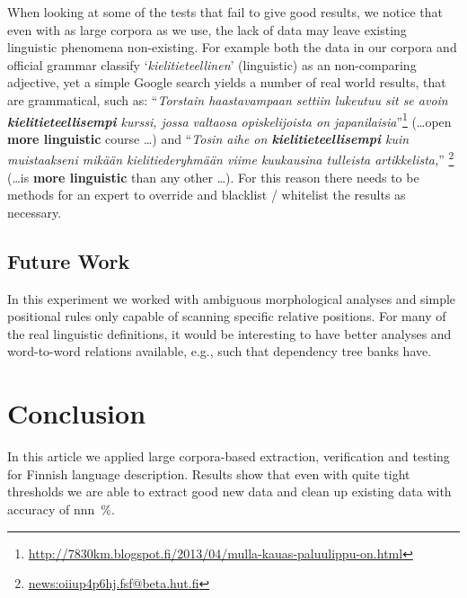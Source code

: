 \documentclass[a5paper]{article}
\begin{document}
When looking at some of the tests that fail to give good results, we notice
that even with as large corpora as we use, the lack of data may leave existing
linguistic phenomena non-existing. For example both the data in our corpora and
official grammar classify `\emph{kielitieteellinen}' (linguistic) as an
non-comparing adjective, yet a simple Google search yields a number of real
world results, that are grammatical, such as: ``\emph{Torstain haastavampaan
    settiin lukeutuu sit se avoin \textbf{kielitieteellisempi} kurssi, jossa
valtaosa opiskelijoista on
japanilaisia}''\footnote{\url{http://7830km.blogspot.fi/2013/04/mulla-kauas-paluulippu-on.html}}
(\ldots open \textbf{more linguistic} course \ldots) and ``\emph{Tosin aihe on
\textbf{kielitieteellisempi} kuin muistaakseni mikään kielitiederyhmään viime
kuukausina tulleista artikkelista,}''
\footnote{\url{news:oiiup4p6hj.fsf@beta.hut.fi}} (\ldots is \textbf{more
linguistic} than any other \ldots). For this reason there needs to be methods
for an expert to override and blacklist / whitelist the results as necessary.

\subsection{Future Work}

In this experiment we worked with ambiguous morphological analyses and simple
positional rules only capable of scanning specific relative
positions. For many of the real linguistic definitions, it would be interesting
to have better analyses and word-to-word relations available, e.g., such that
dependency tree banks have.

\section{Conclusion}

In this article we applied large corpora-based extraction, verification and
testing for Finnish language description. Results show that even with quite
tight thresholds we are able to extract good new data and clean up existing
data with accuracy of nnn~\%.



\end{document}
